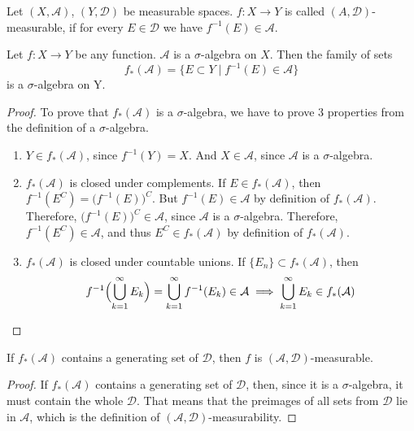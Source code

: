 \begin{definition}
    Let $(X, \mathcal{A})$, $(Y, \mathcal{D})$ be measurable spaces.
    $f : X \to Y$ is called $(A, \mathcal{D})$-measurable, if
    for every $E \in \mathcal{D}$ we have $f^{-1}(E) \in \mathcal{A}$.
\end{definition}
\begin{proposition}
    Let $f: X \to Y$ be any function. $\mathcal{A}$ is a $\sigma$-algebra on $X$.
    Then the family of sets
    \[ f_*(\mathcal{A}) = \{E \subset Y \mid f^{-1}(E) \in \mathcal{A} \} \]
    is a $\sigma$-algebra on Y.
\end{proposition}
\begin{proof}
    To prove that $f_*(\mathcal{A})$ is a $\sigma$-algebra, we have to prove 3
    properties from the definition of a $\sigma$-algebra.
    \begin{enumerate}
        \item {
            $Y \in f_*(\mathcal{A})$, since $f^{-1}(Y) = X$.
            And $X \in \mathcal{A}$, since $\mathcal{A}$ is a $\sigma$-algebra.
        }
        \item {
            $f_*(\mathcal{A})$ is closed under complements.
            If $E \in f_*(\mathcal{A})$, then
            $f^{-1}(E^C) = \bigl(f^{-1}(E)\bigr)^C$.
            But $f^{-1}(E) \in \mathcal{A}$ by definition of $f_*(\mathcal{A})$.
            Therefore, $\bigl(f^{-1}(E)\bigr)^C \in \mathcal{A}$, since $\mathcal{A}$ is a $\sigma$-algebra.
            Therefore, $f^{-1}(E^C) \in \mathcal{A}$, and thus $E^C \in f_*(\mathcal{A})$
            by definition of $f_*(\mathcal{A})$.
        }
        \item {
            $f_*(\mathcal{A})$ is closed under countable unions.
            If $\{E_n\} \subset f_*(\mathcal{A})$, then 
            \[
                f^{-1}\Bigl(\bigcup_{k=1}^\infty E_k\Bigr) = 
                \bigcup_{k=1}^\infty f^{-1}(E_k) \in \mathcal{A} \implies
                \bigcup_{k=1}^\infty E_k \in f_*(\mathcal{A})
            \]
        }
    \end{enumerate}
\end{proof}
\begin{observation}
    \label{obs:contains_generating_set}
    If $f_*(\mathcal{A})$ contains a generating set of $\mathcal{D}$, then
    $f$ is $(\mathcal{A}, \mathcal{D})$-measurable.
\end{observation}
\begin{proof}
    If $f_*(\mathcal{A})$ contains a generating set of $\mathcal{D}$, then, 
    since it is a $\sigma$-algebra, it must contain the whole $\mathcal{D}$. That 
    means that the preimages of all sets from $\mathcal{D}$ lie in 
    $\mathcal{A}$, which is the definition of $(\mathcal{A}, \mathcal{D})$-measurability.
\end{proof}

